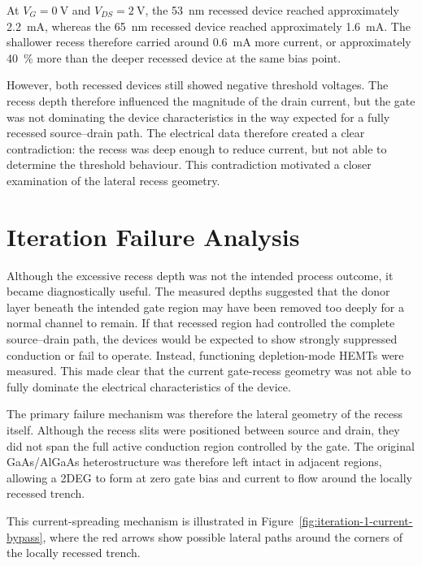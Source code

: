 At $V_G=\SI{0}{\volt}$ and $V_{DS}=\SI{2}{\volt}$, the
\SI{53}{\nano\metre} recessed device reached approximately
\SI{2.2}{\milli\ampere}, whereas the \SI{65}{\nano\metre} recessed device
reached approximately \SI{1.6}{\milli\ampere}. The shallower recess therefore
carried around \SI{0.6}{\milli\ampere} more current, or approximately
\SI{40}{\percent} more than the deeper recessed device at the same bias point.

However, both recessed devices still showed negative threshold voltages. The
recess depth therefore influenced the magnitude of the drain current, but the
gate was not dominating the device characteristics in the way expected for a
fully recessed source--drain path. The electrical data therefore created a
clear contradiction: the recess was deep enough to reduce current, but not
able to determine the threshold behaviour. This contradiction motivated a
closer examination of the lateral recess geometry.

\FloatBarrier

\section{Iteration Failure Analysis}

Although the excessive recess depth was not the intended process outcome, it
became diagnostically useful. The measured depths suggested that the donor
layer beneath the intended gate region may have been removed too deeply for a
normal channel to remain. If that recessed region had controlled the complete
source--drain path, the devices would be expected to show strongly suppressed
conduction or fail to operate. Instead, functioning depletion-mode HEMTs were
measured. This made clear that the current gate-recess geometry was not able
to fully dominate the electrical characteristics of the device.

The primary failure mechanism was therefore the lateral geometry of the recess
itself. Although the recess slits were positioned between source and drain,
they did not span the full active conduction region controlled by the gate. The
original GaAs/AlGaAs heterostructure was therefore left intact in adjacent
regions, allowing a 2DEG to form at zero gate bias and current to flow around
the locally recessed trench.

This current-spreading mechanism is illustrated in
Figure~\ref{fig:iteration-1-current-bypass}, where the red arrows show
possible lateral paths around the corners of the locally recessed trench.

